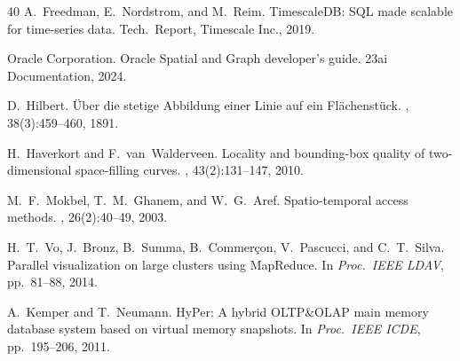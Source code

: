 \documentclass[sigconf]{acmart}
\begin{document}
\begin{thebibliography}{40}
A.~Freedman, E.~Nordstrom, and M.~Reim.
\newblock TimescaleDB: SQL made scalable for time-series data.
\newblock Tech.\ Report, Timescale Inc., 2019.

Oracle Corporation.
\newblock Oracle Spatial and Graph developer's guide.
\newblock 23ai Documentation, 2024.

D.~Hilbert.
\newblock \"{U}ber die stetige Abbildung einer Linie auf ein Fl\"{a}chenst\"{u}ck.
, 38(3):459--460, 1891.

H.~Haverkort and F.~van~Walderveen.
\newblock Locality and bounding-box quality of two-dimensional space-filling curves.
, 43(2):131--147, 2010.

M.~F.~Mokbel, T.~M.~Ghanem, and W.~G.~Aref.
\newblock Spatio-temporal access methods.
, 26(2):40--49, 2003.

H.~T.~Vo, J.~Bronz, B.~Summa, B.~Commer\c{c}on, V.~Pascucci, and C.~T.~Silva.
\newblock Parallel visualization on large clusters using MapReduce.
\newblock In {\em Proc.\ IEEE LDAV}, pp.~81--88, 2014.

A.~Kemper and T.~Neumann.
\newblock HyPer: A hybrid OLTP\&OLAP main memory database system based on virtual memory snapshots.
\newblock In {\em Proc.\ IEEE ICDE}, pp.~195--206, 2011.

\end{thebibliography}
\end{document}
